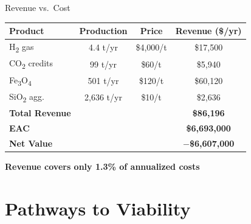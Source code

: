 \documentclass[aspectratio=169]{beamer}
\begin{document}
\begin{frame}{Revenue vs.\ Cost}

\begin{table}
\centering\small
\begin{tabular}{lccc}
\toprule
\textbf{Product} & \textbf{Production} & \textbf{Price} & \textbf{Revenue (\$/yr)} \\
\midrule
H\textsubscript{2} gas & 4.4 t/yr & \$4,000/t & \textcolor{revenue}{\$17,500} \\
CO\textsubscript{2} credits & 99 t/yr & \$60/t & \textcolor{revenue}{\$5,940} \\
Fe\textsubscript{3}O\textsubscript{4} & 501 t/yr & \$120/t & \textcolor{revenue}{\$60,120} \\
SiO\textsubscript{2} agg. & 2,636 t/yr & \$10/t & \textcolor{revenue}{\$2,636} \\
\midrule
\textbf{Total Revenue} & & & \textcolor{revenue}{\textbf{\$86,196}} \\
\midrule
\textbf{EAC} & & & \textcolor{cost}{\textbf{\$6,693,000}} \\
\midrule
\textbf{Net Value} & & & \textcolor{cost}{\textbf{$-$\$6,607,000}} \\
\bottomrule
\end{tabular}
\end{table}

\vspace{0.5em}
\centering\textcolor{StepRed}{\textbf{Revenue covers only 1.3\% of annualized costs}}
\end{frame}

\section{Pathways to Viability}
\end{document}
